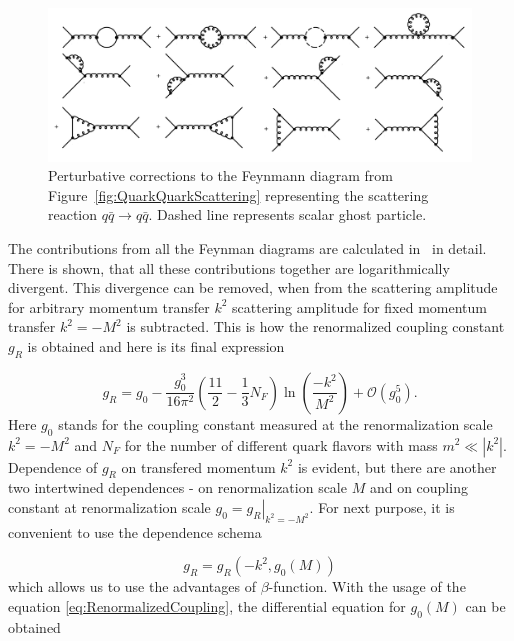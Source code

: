 \begin{figure}[t]
  \centering
  \includegraphics[width=\textwidth]{Chapter1/QuarkQuarkCorrection.png} 
  \caption{Perturbative corrections to the Feynmann diagram from
    Figure~\ref{fig:QuarkQuarkScattering} representing the scattering reaction
    $q \bar{q} \rightarrow q \bar{q}$. Dashed line represents scalar ghost
    particle.}
  \label{fig:QuarkQuarkScatteringCorrection}
\end{figure}

The contributions from all the Feynman diagrams are calculated in~\cite{QCDTextbook}
in detail. There is shown, that all these contributions together are
logarithmically divergent. This divergence can be removed, when from the scattering
amplitude for arbitrary momentum transfer $k^2$ scattering amplitude for fixed
momentum transfer $k^2 = -M^2$ is subtracted. This is how the renormalized
coupling constant $g_R$ is obtained and here is its final expression 

\begin{equation}
  g_R = g_0 - \frac{g_0^3}{16\pi^2} \left( \frac{11}{2} - \frac{1}{3}N_F \right)
  \ln \left( \frac{-k^2}{M^2} \right) + \mathscr{O}(g_0^5).
  \label{eq:RenormalizedCoupling}
\end{equation}
Here $g_0$ stands for the coupling constant measured at the renormalization scale
$k^2 = -M^2$ and $N_F$ for the number of different quark flavors with mass $m^2
\ll \left| k^2 \right|$. Dependence of $g_R$ on transfered momentum $k^2$ is
evident, but there are another two intertwined dependences - on renormalization
scale $M$ and on coupling constant at renormalization scale $g_0 =
\left. g_R \right|_{k^2=-M^2}$. For next purpose, it is convenient to use the
dependence schema

\begin{equation}
  g_R = g_R(-k^2,g_0(M))
  \label{eq:RunningCouplingConstantDependenceSchema}
\end{equation}
which allows us to use the advantages of $\beta$-function. With the usage of the
equation \eqref{eq:RenormalizedCoupling}, the differential equation for $g_0(M)$
can be obtained


